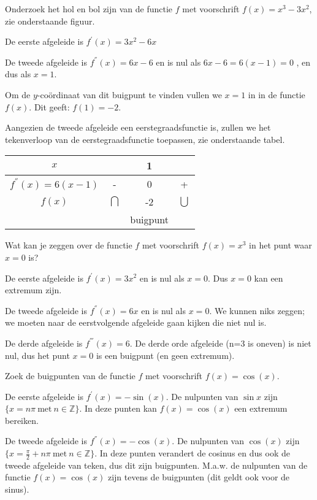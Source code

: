 \begin{voorbeeld}
	Onderzoek het hol en bol zijn van
de functie $f$ met voorschrift $f(x)=x^{3}-3x^{2}$, zie onderstaande figuur.


De eerste afgeleide is $f^{'}(x)=3x^{2}-6x$ 

De tweede afgeleide is $f^{''}(x)=6x-6$ en is nul als $6x-6=6(x-1)=0$
, en dus als $x=1$.

Om de $y$-co\"ordinaat van dit buigpunt te vinden vullen
we $x=1$ in in de functie $f(x)$. Dit geeft: $f(1)=-2$.

Aangezien de tweede afgeleide een eerstegraadsfunctie is,
zullen we het tekenverloop van de eerstegraadsfunctie toepassen, zie onderstaande tabel.

\begin{center}
	\begin{tabular}{c||c|c|c}
	$x$ &  & 1 & \tabularnewline
	\hline 
	$f^{''}(x)=6(x-1)$ & - & 0 & +\\
	\hline 
	$f(x)$ & $\bigcap$ & -2 & $\bigcup$\\
	&  & buigpunt & \\
\end{tabular}
\end{center}

\end{voorbeeld}
\begin{voorbeeld}
	Wat kan je zeggen over de functie $f$ met voorschrift
$f(x)=x^{3}$ in het punt waar $x=0$ is?

De eerste afgeleide is $f^{'}(x)=3x^{2}$ en is nul als
$x=0$. Dus $x=0$ kan een extremum zijn.

De tweede afgeleide is $f^{''}(x)=6x$ en is nul als $x=0$.
We kunnen niks zeggen; we moeten naar de eerstvolgende afgeleide gaan
kijken die niet nul is.

De derde afgeleide is $f^{'''}(x)=6$. De derde orde afgeleide
(n=3 is oneven) is niet nul, dus het punt $x=0$ is een buigpunt (en
geen extremum).

\end{voorbeeld}

\begin{voorbeeld}
	Zoek de buigpunten van de functie $f$ met voorschrift
$f(x)=\cos(x)$.

De eerste afgeleide is $f^{'}(x)=-\sin(x)$. De nulpunten
van $\sin x$ zijn $\{x=n\pi\:\textrm{met}\:n\in\mathbb{Z}\}$. In
deze punten kan $f(x)=\cos(x)$ een extremum bereiken.

De tweede afgeleide is $f^{''}(x)=-\cos(x)$. De nulpunten
van $\cos(x)$ zijn $\{x=\frac{\pi}{2}+n\pi\:\textrm{met}\:n\in\mathbb{Z}\}$.
In deze punten verandert de cosinus en dus ook de tweede afgeleide
van teken, dus dit zijn buigpunten. M.a.w. de nulpunten van de functie
$f(x)=\cos(x)$ zijn tevens de buigpunten (dit geldt ook voor de sinus).

\end{voorbeeld}